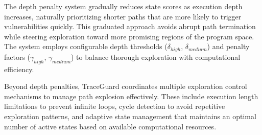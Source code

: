 The depth penalty system gradually reduces state scores as execution depth increases, naturally prioritizing shorter paths that are more likely to trigger vulnerabilities quickly. This graduated approach avoids abrupt path termination while steering exploration toward more promising regions of the program space. The system employs configurable depth thresholds ($\delta_{high}$, $\delta_{medium}$) and penalty factors ($\gamma_{high}$, $\gamma_{medium}$) to balance thorough exploration with computational efficiency.

Beyond depth penalties, TraceGuard coordinates multiple exploration control mechanisms to manage path explosion effectively. These include execution length limitations to prevent infinite loops, cycle detection to avoid repetitive exploration patterns, and adaptive state management that maintains an optimal number of active states based on available computational resources.
